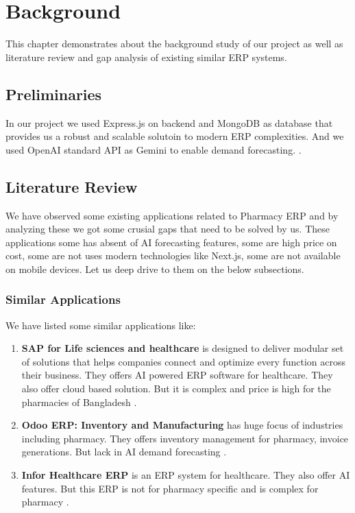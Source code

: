 \chapter{Background}

This chapter demonstrates about the background study of our project as well as literature review and gap analysis of existing similar ERP systems.

\section{Preliminaries}
In our project we used Express.js on backend and MongoDB as database that provides us a robust and scalable solutoin to modern ERP complexities. And we used OpenAI standard API as Gemini \cite{geminiOpenAI} to enable demand forecasting. .
\section{Literature Review}


We have observed some existing applications related to Pharmacy ERP and by analyzing these we got some crusial gaps that need to be solved by us. These applications some has absent of AI forecasting features, some are high price on cost, some are not uses modern technologies like Next.js, some are not available on mobile devices. Let us deep drive to them on the below subsections.

\subsection{Similar Applications}

We have listed some similar applications like:
\begin{enumerate}
  \item \textbf{SAP for Life sciences and healthcare} is designed to deliver modular set of solutions that helps companies connect and optimize every function across their business. They offers AI powered ERP software for healthcare. They also offer cloud based solution. But it is complex and price is high for the pharmacies of Bangladesh \cite{sapPharma}. 
  \item \textbf{Odoo ERP: Inventory and Manufacturing} has huge focus of industries including pharmacy. They offers inventory management for pharmacy, invoice generations. But lack in AI demand forecasting \cite{odooERP}.
  \item \textbf{Infor Healthcare ERP} is an ERP system for healthcare. They also offer AI features. But this ERP is not for pharmacy specific and is complex for pharmacy \cite{inforHealthcare}. 
\end{enumerate}

